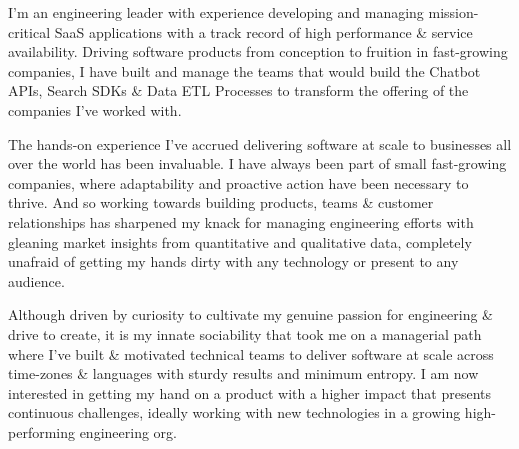 

\begin{cvparagraph}

I'm an engineering leader with experience developing and managing mission-critical SaaS applications with a track record of high performance \& service availability. Driving software products from conception to fruition in fast-growing companies, I have built and manage the teams that would build the Chatbot APIs, Search SDKs \& Data ETL Processes to transform the offering of the companies I've worked with.

The hands-on experience I've accrued delivering software at scale to businesses all over the world has been invaluable. I have always been part of small fast-growing companies, where adaptability and proactive action have been necessary to thrive. And so working towards building products, teams \& customer relationships has sharpened my knack for managing engineering efforts with gleaning market insights from quantitative and qualitative data, completely unafraid of getting my hands dirty with any technology or present to any audience.

Although driven by curiosity to cultivate my genuine passion for engineering \& drive to create, it is my innate sociability that took me on a managerial path where I've built \& motivated technical teams to deliver software at scale across time-zones \& languages with sturdy results and minimum entropy. I am now interested in getting my hand on a product with a higher impact that presents continuous challenges, ideally working with new technologies in a growing high-performing engineering org.
\end{cvparagraph}